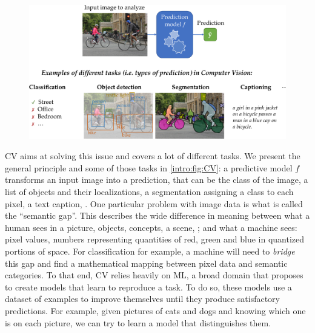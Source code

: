 \begin{figure}[tb]
	\centering
	\includegraphics[width=\linewidth]{images/intro_CV}
	\label{intro:fig:CV}
\end{figure}

\acf{CV} aims at solving this issue and covers a lot of different tasks. We present the general principle and some of those tasks in \autoref{intro:fig:CV}: a predictive model $f$ transforms an input image into a prediction, that can be the class of the image, a list of objects and their localizations, a segmentation assigning a class to each pixel, a text caption, \etc. One particular problem with image data is what is called the ``semantic gap''. This describes the wide difference in meaning between what a human sees in a picture, \ie objects, concepts, a scene, \etc; and what a machine sees: pixel values, \ie numbers representing quantities of red, green and blue in quantized portions of space. For classification for example, a machine will need to \textit{bridge} this gap and find a mathematical mapping between pixel data and semantic categories.
%
To that end, \ac{CV} relies heavily on \acf{ML}, a broad domain that proposes to create models that learn to reproduce a task. To do so, these models use a dataset of examples to improve themselves until they produce satisfactory predictions. For example, given pictures of cats and dogs and knowing which one is on each picture, we can try to learn a model that distinguishes them.


